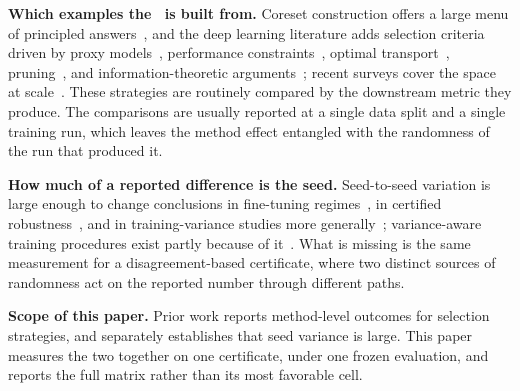 \textbf{Which examples the \surrogate\ is built from.}
Coreset construction offers a large menu of principled
answers~\cite{jubran2019introduction, blmer2016coreset, maalouf2021unified,
jaiswal2023universal, chhaya2020coresets, jourdan2025coreset, chen2024tuningfree},
and the deep learning literature adds selection criteria driven by proxy
models~\cite{coleman2019selection}, performance constraints~\cite{xia2023refined},
optimal transport~\cite{feng2024tarot}, pruning~\cite{kousar2025pruningbased},
and information-theoretic arguments~\cite{foggo2019analyzing}; recent surveys
cover the space at scale~\cite{albalak2024survey}. These strategies are
routinely compared by the downstream metric they produce. The comparisons are
usually reported at a single data split and a single training run, which leaves
the method effect entangled with the randomness of the run that produced it.

\textbf{How much of a reported difference is the seed.}
Seed-to-seed variation is large enough to change conclusions in fine-tuning
regimes~\cite{bui2025assessing}, in certified robustness~\cite{le2026extreme},
and in training-variance studies more
generally~\cite{steier2026margin, sun2026varianceaware}; variance-aware training
procedures exist partly because of it~\cite{zantedeschi2021stochastic,
viallard2024leveraging, warrell2022higherorder}. What is missing is the same
measurement for a disagreement-based certificate, where two distinct sources of
randomness act on the reported number through different paths.

\textbf{Scope of this paper.}
Prior work reports method-level outcomes for selection strategies, and separately
establishes that seed variance is large. This paper measures the two together on
one certificate, under one frozen evaluation, and reports the full matrix rather
than its most favorable cell.
